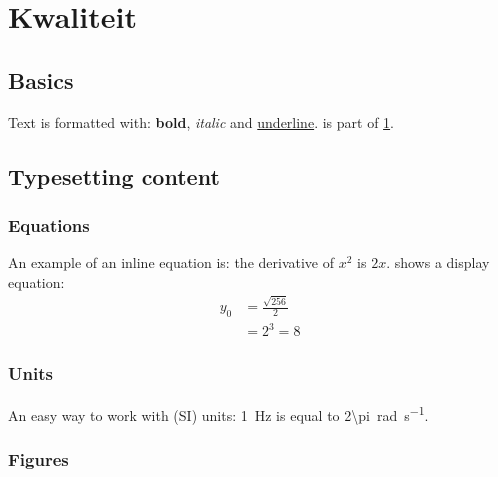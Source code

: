 \chapter{Kwaliteit} \label{cha:your-first-document}


\section{Basics} \label{sec:basics}

Text is formatted with: \textbf{bold}, \textit{italic} and \underline{underline}.
 is part of \cref{cha:your-first-document}.


\section{Typesetting content} \label{sec:typesetting}


\subsection{Equations} \label{subsec:equations}

An example of an inline equation is: the derivative of $x^2$ is $2x$.  shows a display equation:
\begin{align} \label{eq:example}
          y_{0} &= \frac{\sqrt{256}}{2} \\
                &= 2^{3} = 8 \nonumber 
\end{align}


\subsection{Units} \label{subsec:units}

An easy way to work with (SI) units: \SI{1}{\hertz} is equal to \SI{2\pi}{\radian\per\second}.


\subsection{Figures} \label{subsec:figures}

